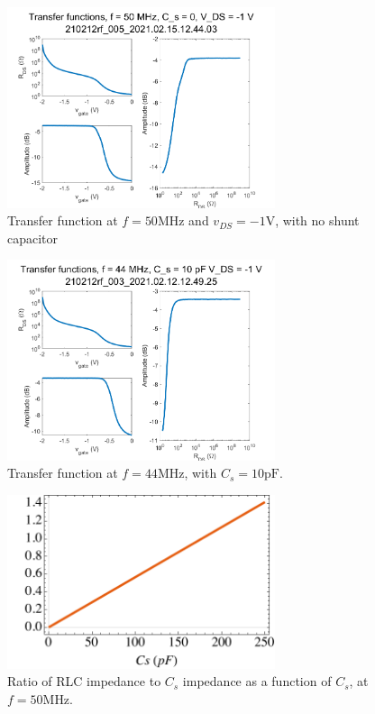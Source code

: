 \documentclass{article}
\begin{document}
\begin{figure}[H]
    \centering
    \includegraphics[width = 0.7\textwidth]{210212rf_005_2021.02.15.12.44.03_final_rf-transfer.png}
    \caption{Transfer function at $f = 50\si{\mega\hertz}$ and $v_{DS} = -1\si{\volt}$, with no shunt capacitor}
    \label{fig:extra3}
\end{figure}
\begin{figure}[H]
    \centering
    \includegraphics[width = 0.7\textwidth]{210212rf_003_2021.02.12.12.49.25_final_rf-transfer.png}
    \caption{Transfer function at $f = 44\si{\mega\hertz}$, with $C_s = 10\si{\pico\farad}$.}
    \label{fig:extra4}
\end{figure}

\begin{figure}
    \centering
    \includegraphics[width=0.7\textwidth]{impedanceratio.pdf}
    \caption{Ratio of RLC impedance to $C_s$ impedance as a function of $C_s$, at $f=50\si{\mega\hertz}$.}
    \label{fig:impedanceratio}
\end{figure}
\end{document}
